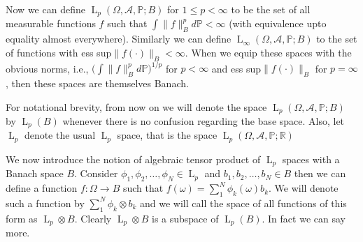 \documentclass[]{report}
\newcommand{\lp}[2]{\operatorname{L}_{#1}({#2})}
\newcommand*{\Normb}[2]{\lVert {#1} \rVert_{#2}}
\newcommand{\pspc}{\Omega,\mathcal{A},\mathbb{P}}
\begin{document}
Now we can define $\lp{p}{\pspc;B}$ for $1\leq p < \infty$ to be the set of all measurable functions $f$ such that $\int\Normb{f}{B}^p d\mathbb{P} < \infty$ (with equivalence upto equality almost everywhere). Similarly we can define $\lp{\infty}{\pspc;B}$ to the set of functions with ess sup$\Normb{f(\cdot)}{B} < \infty$. When we equip these spaces with the obvious norms, i.e., $\big(\int \Normb{f}{B}^pd\mathbb{P}\big)^{1/p}$ for $p<\infty$ and ess sup$\Normb{f(\cdot)}{B}$ for $p=\infty$, then these spaces are themselves Banach. 

For notational brevity, from now on we will denote the space $\lp{p}{\pspc;B}$ by $\lp{p}{B}$ whenever there is no confusion regarding the base space. Also, let $\operatorname{L}_p$ denote the usual $\operatorname{L}_p$ space, that is the space $\lp{p}{\pspc;\mathbb{R}}$

We now introduce the notion of algebraic tensor product of $\operatorname{L}_p$ spaces with a Banach space $B$. Consider $ \phi_1,\phi_2,\ldots,\phi_N \in \operatorname{L}_p$ and $b_1,b_2,\ldots,b_N \in B$ then we can define a function $f: \Omega \rightarrow B$ such that $f(\omega)=\sum_{1}^{N}\phi_k(\omega)b_k$. We will denote such a function by $\sum_{1}^{N}\phi_k\otimes b_k $ and we will call the space of all functions of this form as $\operatorname{L}_p\otimes B$. Clearly $\operatorname{L}_p\otimes B$ is a subspace of $\lp{p}{B}$. In fact we can say more.
\end{document}
